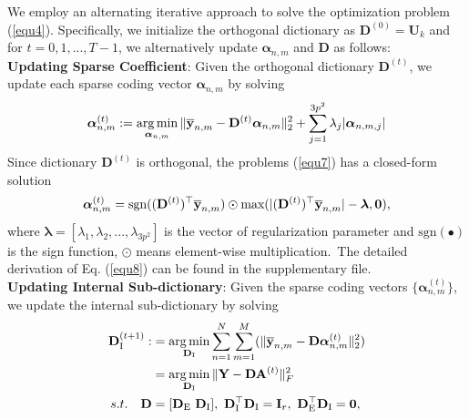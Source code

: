 \documentclass[10pt,twocolumn,letterpaper]{article}
\DeclareMathOperator*{\argmin}{arg\,min}
\begin{document}
We employ an alternating iterative approach to solve the optimization problem (\ref{equ4}). Specifically, we initialize the orthogonal dictionary as $\mathbf{D}^{(0)}=\mathbf{U}_{k}$ and for $t=0,1, ...,T-1$, we alternatively update $\bm{\alpha}_{n,m}$ and $\mathbf{D}$ as follows:
\vspace{2mm}\\
\textbf{Updating Sparse Coefficient}: Given the orthogonal dictionary $\textbf{D}^{(t)}$, we update each sparse coding vector $\bm{\alpha}_{n,m}$ by solving
\vspace{-4mm}
\begin{equation}\label{equ7}\vspace{-4mm}
\begin{split}
\bm{\alpha}_{n,m}^{(t)}:=\argmin_{\bm{\alpha}_{n,m}}
\|\mathbf{\overline{y}}_{n,m}-\mathbf{D}^{(t)}\bm{\alpha}_{n,m}\|_{2}^{2}+\sum_{j=1}^{3p^{2}}\lambda_{j}|\bm{\alpha}_{n,m,j}|
\end{split}
\end{equation}
Since dictionary $\mathbf{D}^{(t)}$ is orthogonal, the problems (\ref{equ7}) has a closed-form solution
\vspace{-2mm}
\begin{equation}\label{equ8}\vspace{-2mm}
\bm{\alpha}_{n,m}^{(t)}= \text{sgn}((\mathbf{D}^{(t)})^{\top}\mathbf{\overline{y}}_{n,m})\odot \text{max}(|(\mathbf{D}^{(t)})^{\top}\mathbf{\overline{y}}_{n,m}|-\bm{\lambda},\mathbf{0}),
\end{equation}
where $\bm{\lambda} = [\lambda_{1},\lambda_{2},...,\lambda_{3p^2}]$ is the vector of regularization parameter and $\text{sgn}(\bullet)$ is the sign function, $\odot$ means element-wise multiplication.\ The detailed derivation of Eq. (\ref{equ8}) can be found in the supplementary file.
\vspace{2mm}\\
\textbf{Updating Internal Sub-dictionary}: Given the sparse coding vectors $\{\bm{\alpha}_{n,m}^{(t)}\}$, we update the internal sub-dictionary by solving
\vspace{-2mm}
\begin{equation}\label{equ9} \vspace{-2mm}
\begin{split}
\textbf{D}_{\text{I}}^{(t+1)}
:
&
=
\argmin_{\textbf{D}_{\text{I}}}
\sum_{n=1}^{N}\sum_{m=1}^{M}(\|\mathbf{\overline{y}}_{n,m}-\mathbf{D}\bm{\alpha}_{n,m}^{(t)}\|_{2}^{2})
\\
&
=
\argmin_{\textbf{D}_{\text{I}}}
\|\mathbf{Y}-\mathbf{D}\mathbf{A}^{(t)}\|_{F}^{2}
\\
s.t.
\quad
\mathbf{D}
&
=
[\mathbf{D}_{\text{E}}\ \mathbf{D}_{\text{I}}],\ \mathbf{D}_{\text{I}}^{\top}\mathbf{D}_{\text{I}} = \mathbf{I}_{r},\ \mathbf{D}_{\text{E}}^{\top}\mathbf{D}_{\text{I}} = \mathbf{0},
\end{split}
\end{equation}
\end{document}
